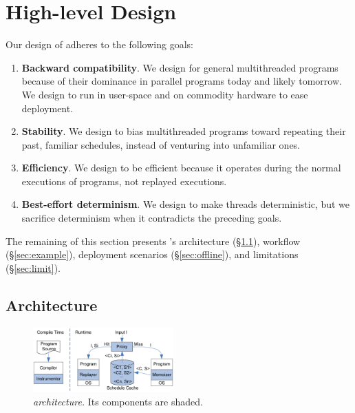 \section{High-level Design}\label{sec:tern-design}


Our design of \tern adheres to the following goals:

\begin{enumerate}

\item {\bf Backward compatibility}.  We design \tern for general
  multithreaded programs because of their dominance in parallel programs
  today and likely tomorrow.  We design \tern to run in user-space and on
  commodity hardware to ease deployment.

\item {\bf Stability}.  We design \tern to bias multithreaded programs
  toward repeating their past, familiar schedules, instead of venturing
  into unfamiliar ones.

\item {\bf Efficiency}.  We design \tern to be efficient because it
  operates during the normal executions of programs, not replayed
  executions.

\item {\bf Best-effort determinism}.  We design \tern to make threads
  deterministic, but we sacrifice determinism when it contradicts the
  preceding goals.

\end{enumerate}

The remaining of this section presents \tern's architecture
(\S\ref{sec:arch}), workflow (\S\ref{sec:example}), deployment scenarios
(\S\ref{sec:offline}), and limitations (\S\ref{sec:limit}).


\subsection{Architecture} \label{sec:arch}

\begin{figure}[t]
\begin{center}
\includegraphics[width=0.48\textwidth]{tern/figures/overview.eps}
\end{center}
\caption{\emph{\tern architecture.} Its components are shaded.}
\label{fig:overview}
\end{figure}

